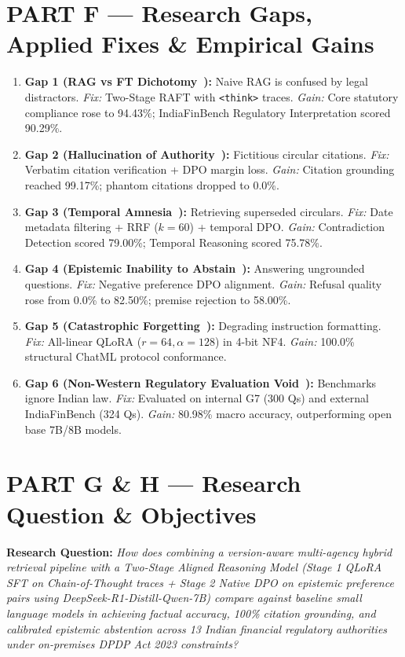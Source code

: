 \documentclass[11pt,a4paper]{article}
\begin{document}
\section*{PART F --- Research Gaps, Applied Fixes \& Empirical Gains}
\begin{enumerate}
    \item \textbf{Gap 1 (RAG vs FT Dichotomy~\cite{ovadia2024knowledge}):} Naive RAG is confused by legal distractors. \emph{Fix:} Two-Stage RAFT with \texttt{<think>} traces. \emph{Gain:} Core statutory compliance rose to 94.43\%; IndiaFinBench Regulatory Interpretation scored 90.29\%.
    \item \textbf{Gap 2 (Hallucination of Authority~\cite{magesh2025hallucination}):} Fictitious circular citations. \emph{Fix:} Verbatim citation verification + DPO margin loss. \emph{Gain:} Citation grounding reached 99.17\%; phantom citations dropped to 0.0\%.
    \item \textbf{Gap 3 (Temporal Amnesia~\cite{kim2026jurisdiction}):} Retrieving superseded circulars. \emph{Fix:} Date metadata filtering + RRF ($k=60$) + temporal DPO. \emph{Gain:} Contradiction Detection scored 79.00\%; Temporal Reasoning scored 75.78\%.
    \item \textbf{Gap 4 (Epistemic Inability to Abstain~\cite{magesh2025hallucination}):} Answering ungrounded questions. \emph{Fix:} Negative preference DPO alignment. \emph{Gain:} Refusal quality rose from 0.0\% to 82.50\%; premise rejection to 58.00\%.
    \item \textbf{Gap 5 (Catastrophic Forgetting~\cite{biderman2024lora}):} Degrading instruction formatting. \emph{Fix:} All-linear QLoRA ($r=64, \alpha=128$) in 4-bit NF4. \emph{Gain:} 100.0\% structural ChatML protocol conformance.
    \item \textbf{Gap 6 (Non-Western Regulatory Evaluation Void~\cite{pall2026indiafinbench}):} Benchmarks ignore Indian law. \emph{Fix:} Evaluated on internal G7 (300 Qs) and external IndiaFinBench (324 Qs). \emph{Gain:} 80.98\% macro accuracy, outperforming open base 7B/8B models.
\end{enumerate}

\section*{PART G \& H --- Research Question \& Objectives}
\textbf{Research Question:} \emph{How does combining a version-aware multi-agency hybrid retrieval pipeline with a Two-Stage Aligned Reasoning Model (Stage 1 QLoRA SFT on Chain-of-Thought traces + Stage 2 Native DPO on epistemic preference pairs using DeepSeek-R1-Distill-Qwen-7B) compare against baseline small language models in achieving factual accuracy, 100\% citation grounding, and calibrated epistemic abstention across 13 Indian financial regulatory authorities under on-premises DPDP Act 2023 constraints?}
\end{document}
